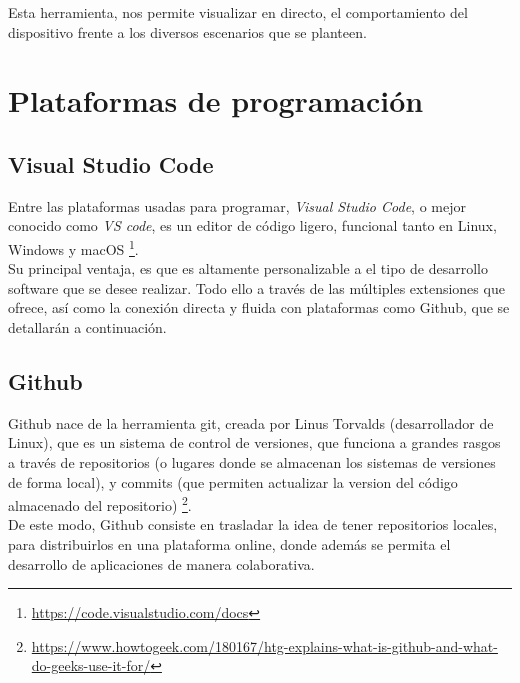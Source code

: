 Esta herramienta, nos permite visualizar en directo, el comportamiento del dispositivo frente a los diversos escenarios que se planteen.

\section{Plataformas de programación}
\label{sec:plataformas_de_programacion}

\subsection{Visual Studio Code}
\label{subsec:visual_studio_code}


Entre las plataformas usadas para programar, \emph{Visual Studio Code}, o mejor conocido como \emph{VS code}, es un editor de código ligero, funcional tanto en Linux, Windows y macOS \footnote[9]{\url{https://code.visualstudio.com/docs}}.\\

Su principal ventaja, es que es altamente personalizable a el tipo de desarrollo software que se desee realizar. Todo ello a través de las múltiples extensiones que ofrece, así como la conexión directa y fluida con plataformas como Github, que se detallarán a continuación.\\

\subsection{Github}
\label{subsec:github}

Github nace de la herramienta git, creada por Linus Torvalds (desarrollador de Linux), que es un sistema de control de versiones, que funciona a grandes rasgos a través de repositorios (o lugares donde se almacenan los sistemas de versiones de forma local), y commits (que permiten actualizar la version del código almacenado del repositorio) \footnote[10]{\url{https://www.howtogeek.com/180167/htg-explains-what-is-github-and-what-do-geeks-use-it-for/}}.\\

De este modo, Github consiste en trasladar la idea de tener repositorios locales, para distribuirlos en una plataforma online, donde además se permita el desarrollo de aplicaciones de manera colaborativa.\\

